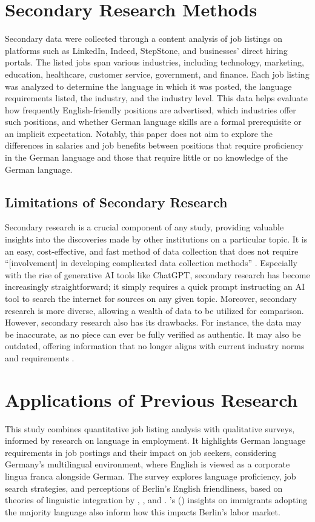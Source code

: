 \section{Secondary Research Methods}
Secondary data were collected through a content analysis of job listings on platforms such as LinkedIn, Indeed, StepStone, and businesses’ direct hiring portals. The listed jobs span various industries, including technology, marketing, education, healthcare, customer service, government, and finance. Each job listing was analyzed to determine the language in which it was posted, the language requirements listed, the industry, and the industry level. This data helps evaluate how frequently English-friendly positions are advertised, which industries offer such positions, and whether German language skills are a formal prerequisite or an implicit expectation. Notably, this paper does not aim to explore the differences in salaries and job benefits between positions that require proficiency in the German language and those that require little or no knowledge of the German language.

\subsection{Limitations of Secondary Research}
Secondary research is a crucial component of any study, providing valuable insights into the discoveries made by other institutions on a particular topic. It is an easy, cost-effective, and fast method of data collection that does not require “[involvement] in developing complicated data collection methods” \citep{Nasrudin25}. Especially with the rise of generative AI tools like ChatGPT, secondary research has become increasingly straightforward; it simply requires a quick prompt instructing an AI tool to search the internet for sources on any given topic. Moreover, secondary research is more diverse, allowing a wealth of data to be utilized for comparison. However, secondary research also has its drawbacks. For instance, the data may be inaccurate, as no piece can ever be fully verified as authentic. It may also be outdated, offering information that no longer aligns with current industry norms and requirements \citep{Nasrudin25}.

\section{Applications of Previous Research}
This study combines quantitative job listing analysis with qualitative surveys, informed by research on language in employment. It highlights German language requirements in job postings and their impact on job seekers, considering Germany's multilingual environment, where English is viewed as a corporate lingua franca alongside German. The survey explores language proficiency, job search strategies, and perceptions of Berlin's English friendliness, based on theories of linguistic integration by \citet{Shohamy06}, \citet{LinguaFranca}, and \citet{Neeley2012}. \citeauthor{gogolin02}'s (\citeyear{gogolin02}) insights on immigrants adopting the majority language also inform how this impacts Berlin's labor market. \par